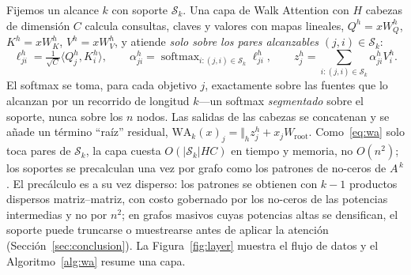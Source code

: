 \documentclass[runningheads]{llncs}
\newcommand{\Adj}{A}
\DeclareMathOperator{\softmax}{softmax}
\begin{document}
Fijemos un alcance $k$ con soporte $\mathcal{S}_k$. Una capa de Walk Attention
con $H$ cabezas de dimensión $C$ calcula consultas, claves y valores con mapas
lineales, $Q^h=xW^h_Q$, $K^h=xW^h_K$, $V^h=xW^h_V$, y atiende \emph{solo sobre
los pares alcanzables} $(j,i)\in\mathcal{S}_k$:
\begin{equation}\label{eq:wa}
  \ell^h_{ji} = \tfrac{1}{\sqrt{C}}\langle Q^h_j,K^h_i\rangle,\qquad
  \alpha^h_{ji} = \softmax_{i:(j,i)\in\mathcal{S}_k}\ell^h_{ji},\qquad
  z^h_j = \textstyle\sum_{i:(j,i)\in\mathcal{S}_k}\alpha^h_{ji}V^h_i.
\end{equation}
El softmax se toma, para cada objetivo $j$, exactamente sobre las fuentes que
lo alcanzan por un recorrido de longitud $k$---un softmax \emph{segmentado}
sobre el soporte, nunca sobre los $n$ nodos. Las salidas de las cabezas se
concatenan y se añade un término ``raíz'' residual,
$\mathrm{WA}_k(x)_j=\Vert_h z^h_j + x_jW_{\!\text{root}}$. Como~\eqref{eq:wa}
solo toca pares de $\mathcal{S}_k$, la capa cuesta $O(|\mathcal{S}_k|HC)$ en
tiempo y memoria, no $O(n^2)$; los soportes se precalculan una vez por grafo
como los patrones de no-ceros de $\Adj^{\,k}$. El precálculo es a su vez
disperso: los patrones se obtienen con $k-1$ productos dispersos
matriz--matriz, con costo gobernado por los no-ceros de las potencias
intermedias y no por $n^2$; en grafos masivos cuyas potencias altas se
densifican, el soporte puede truncarse o muestrearse antes de aplicar la
atención (Sección~\ref{sec:conclusion}). La Figura~\ref{fig:layer}
muestra el flujo de datos y el Algoritmo~\ref{alg:wa} resume una capa.
\end{document}
